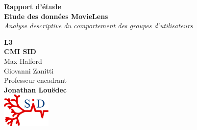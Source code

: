 \begin{titlepage}

\begin{center}

\textup{\small {\bf Rapport d'étude}}\\[0.2in]

\Large \textbf {Etude des données MovieLens}\\[0.5in]

       \small \emph{Analyse descriptive du comportement des groupes d'utilisateurs}
        \vspace{.2in}

       {\bf L3 \\ CMI SID}\\
      
\vspace{.2in}
\centering
Max Halford \\
Giovanni Zanitti \\
 
\vspace{.2in}
Professeur encadrant\\
{\textbf{Jonathan Louëdec}}\\[0.2in]

\vspace{.2in}
\includegraphics[width=0.18\textwidth]{./logoSID.png}\\[0.1in]

\end{center}

\end{titlepage}
